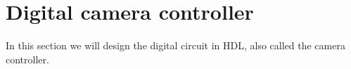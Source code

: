\section{Digital camera controller}

In this section we will design the digital circuit in HDL, also called the camera controller.

